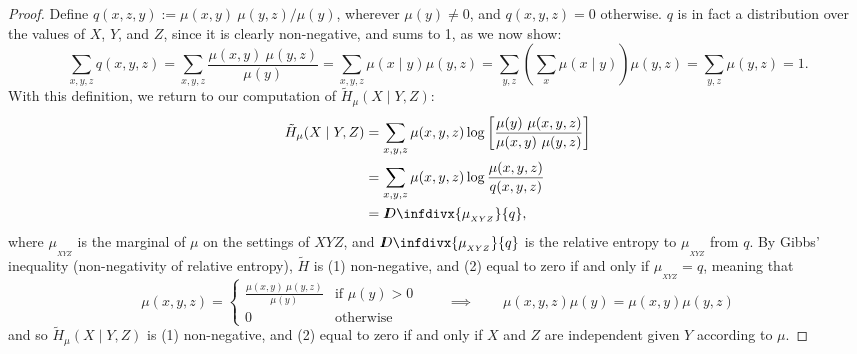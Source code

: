 \documentclass[letterpaper]{article} %
\theoremstyle{plain}
\theoremstyle{definition}
\theoremstyle{remark}
\newcommand{\thickD}{I\mkern-8muD}
\newcommand{\kldiv}{\thickD\infdivx}
\begin{document}
{\begin{proof}
Define $q(x,z,y) := {\mu(x,y)\ \mu(y,z) }/{\mu(y)}$, wherever
			$\mu(y)\neq 0$, and $q(x,y,z) = 0$ otherwise. $q$ is in fact
	a distribution over the values of $X$, $Y$, and $Z$, since it  
is clearly non-negative, and sums to 1, as we now show:
\[
\sum_{x,y,z} q(x,y, z) = \sum_{x,y,z} \frac{\mu(x,y)\ \mu(y,z)}{\mu(y)}
= \sum_{x,y,z} \mu(x \mid y) \mu(y,z)
= \sum_{y,z} \left(\sum_x \mu(x \mid y)\right) \mu(y,z)
= \sum_{y,z}  \mu(y,z)
		= 1.
\]	
With this definition, we return to our computation of $\tilde H_\mu(X \mid Y, Z)$:
\begin{align*}
	\tilde H_\mu(X \mid Y, Z) &= \sum_{x,y, z}  \mu(x,y ,z) \log \left[\frac{\mu(y)\ \mu(x,y,z)}{\mu(x,y)\ \mu(y,z)} \right]  \\ %
	&= \sum_{x,y, z}  \mu(x,y ,z) \log \frac{\mu(x,y,z)}{q(x,y,z)}  \\
					&= \kldiv{\mu_{_{XYZ}}}{q},
\end{align*}
where $\mu_{_{XYZ}}$ is the marginal of $\mu$ on the settings of $XYZ$, and $\kldiv{\mu_{_{XYZ}}}{q}$ is the relative entropy to $\mu_{_{XYZ}}$ from $q$. By Gibbs' inequality (non-negativity of relative entropy), $\tilde H$ is  (1) non-negative, and (2) equal to zero if and only if $\mu_{_{XYZ}} = q$, meaning that 
\[  \mu(x,y,z) =\begin{cases} \frac{\mu(x,y)\ \mu(y,z)}{\mu(y)} & \text{if }\mu(y) > 0\\ 0 & \text{otherwise} \end{cases} \qquad \implies \qquad \mu(x,y,z) \mu(y) = \mu(x,y) \mu(y, z) \] 
and so $\tilde H_\mu(X \mid Y, Z)$ is (1) non-negative, and
	(2) equal to zero if and only if $X$ and $Z$ are independent
			given $Y$ according to $\mu$. 
\end{proof}
}
\end{document}

